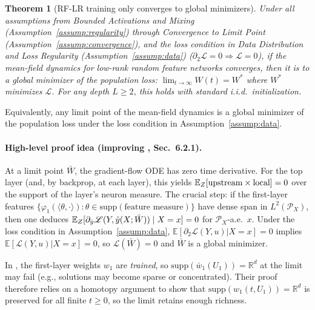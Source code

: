 \documentclass[nohyperref]{article}
\theoremstyle{plain}
\newtheorem{theorem}{Theorem}[section]
\theoremstyle{definition}
\theoremstyle{remark}
\begin{document}
\begin{theorem}[RF-LR training only converges to global minimizers]
\label{thm:convergence}
Under all assumptions from \emph{Bounded Activations and Mixing} (Assumption~\ref{assump:regularity}) through \emph{Convergence to Limit Point} (Assumption~\ref{assump:convergence}), and the \emph{loss condition} in \emph{Data Distribution and Loss Regularity} (Assumption~\ref{assump:data}) ($\partial_2\mathcal{L}=0\Rightarrow\mathcal{L}=0$), if the mean-field dynamics for low-rank random feature networks converges, then it is to a global minimizer of the population loss: $\lim_{t\to\infty} W(t)=W^*$ where $W^*$ minimizes $\mathscr{L}$. For any depth $L\ge 2$, this holds with standard i.i.d.\ initialization.
\end{theorem}

Equivalently, any limit point of the mean-field dynamics is a global minimizer of the population loss under the loss condition in Assumption~\ref{assump:data}.

\paragraph{High-level proof idea (improving \cite{nguyen2023rigorousframeworkmeanfield}, Sec.~6.2.1).}
At a limit point $\bar W$, the gradient-flow ODE has zero time derivative. For the top layer (and, by backprop, at each layer), this yields $\mathbb{E}_Z[\text{upstream} \times \text{local}] = 0$ over the support of the layer's neuron measure. The crucial step: if the first-layer features $\{\varphi_1(\langle \theta, \cdot \rangle) : \theta \in \text{supp}(\text{feature measure})\}$ have dense span in $L^2(\mathcal{P}_X)$, then one deduces $\mathbb{E}_Z[\partial_{\hat{y}}\mathscr{L}(Y,\hat{y}(X;\bar W)) \mid X=x]=0$ for $\mathcal{P}_X$-a.e.\ $x$. Under the loss condition in Assumption~\ref{assump:data}, $\mathbb{E}[\partial_2\mathcal{L}(Y,u)|X=x]=0$ implies $\mathbb{E}[\mathcal{L}(Y,u)|X=x]=0$, so $\mathscr{L}(\bar W)=0$ and $\bar W$ is a global minimizer.

In \cite{nguyen2023rigorousframeworkmeanfield}, the first-layer weights $w_1$ are \emph{trained}, so $\text{supp}(\bar w_1(U_1)) = \mathbb{R}^d$ at the limit may fail (e.g., solutions may become sparse or concentrated). Their proof therefore relies on a homotopy argument to show that $\text{supp}(w_1(t, U_1)) = \mathbb{R}^d$ is preserved for all finite $t \ge 0$, so the limit retains enough richness. 
\end{document}
